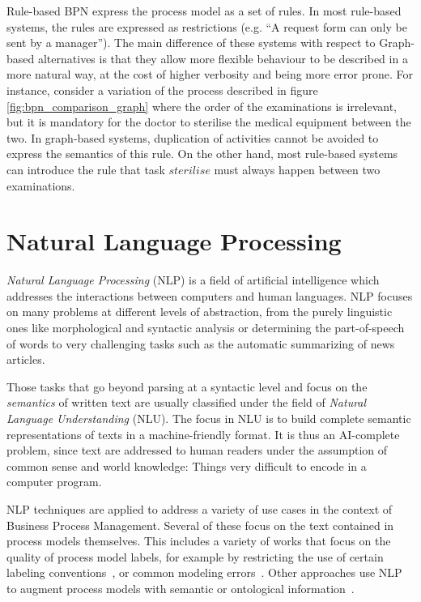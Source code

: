 Rule-based BPN express the process model as a set of rules. In most rule-based
systems, the rules are expressed as restrictions (e.g. ``A request form can only
be sent by a manager''). The main difference of these systems with respect to
Graph-based alternatives is that they allow more flexible behaviour to be
described in a more natural way, at the cost of higher verbosity and being more
error prone. For instance, consider a variation of the process described in
figure \ref{fig:bpn_comparison_graph} where the order of the examinations is
irrelevant, but it is mandatory for the doctor to sterilise the medical
equipment between the two. In graph-based systems, duplication of activities
cannot be avoided to express the semantics of this rule. On the other hand, most
rule-based systems can introduce the rule that task $sterilise$ must always
happen between two examinations.

\section{Natural Language Processing}
\label{sec:background_nlp}

\emph{Natural Language Processing} (NLP) is a field of artificial intelligence which
addresses the interactions between computers and human languages. NLP focuses on
many problems at different levels of abstraction, from the purely linguistic
ones like morphological and syntactic analysis or determining the part-of-speech
of words to very challenging tasks such as the automatic summarizing of news
articles.


Those tasks that go beyond parsing at a syntactic level and focus on the
\emph{semantics} of written text are usually classified under the field of
\emph{Natural Language Understanding} (NLU). The focus in NLU is to build
complete semantic representations of texts in a machine-friendly format. It is
thus an AI-complete~\cite[Section 1]{ai_completeness} problem, since text are
addressed to human readers under the assumption of common sense and world
knowledge: Things very difficult to encode in a computer program. 

NLP techniques are applied to address a variety of use cases in the context of
Business Process Management. Several of these focus on the text contained in
process models themselves. This includes a variety of works that focus on the
quality of process model labels, for example by restricting the use of certain
labeling
conventions~\cite{becker2009,leopold2013detection,vandervos1997verification},
or common modeling errors~\cite{gruhn2011detecting}. Other approaches use NLP to
augment process models with semantic or ontological
information~\cite{leopold2015towards,francescomarino2009supporting,born2007userfriendly}.

